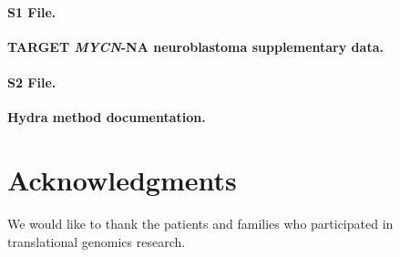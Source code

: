 \documentclass[10pt,letterpaper]{article}
\begin{document}
\paragraph*{S1 File.}
\label{S1_File}
{\bf TARGET \textit{MYCN}-NA neuroblastoma supplementary data.}

\paragraph*{S2 File.}
\label{S2_File}
{\bf Hydra method documentation.}



\section*{Acknowledgments}
We would like to thank the patients and families who participated in translational genomics research.

\nolinenumbers

%
%
%


%

\end{document}
